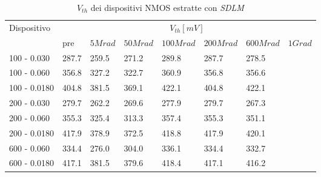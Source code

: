 \documentclass[
	a4paper,
	cleardoublepage=empty,
	headings=twolinechapter,
	numbers=autoenddot,
]{scrbook}
\begin{document}
\begin{table}[H]
  \renewcommand{\arraystretch}{1.3}
  \begin{tabular}{m{2.1cm} m{0.8cm} m{1.1cm} m{1.3cm} m{1.5cm} m{1.5cm} m{1.5cm} m{1cm}}
    \toprule
    \multirow{2}{*}{Dispositivo} & \multicolumn{7}{c}{$V_{th} [mV] $}                                                                    \\
    \cmidrule{2-8}
                                 & pre                                & $5Mrad$ & $50Mrad$ & $100Mrad$ & $200Mrad$ & $600Mrad$ & $1Grad$ \\
    \midrule
    100 - 0.030                     & 287.7                              & 259.5   & 271.2    & 289.8     & 287.7     & 278.5     &         \\
    \hline
    100 - 0.060                     & 356.8                              & 327.2   & 322.7    & 360.9     & 356.8     & 356.6     &         \\
    \hline
    100 - 0.0180                    & 404.8                              & 381.5   & 369.1    & 422.1     & 404.8     & 422.1     &         \\
    \hline
    200 - 0.030                     & 279.7                              & 262.2   & 269.6    & 277.9     & 279.7     & 267.3     &         \\
    \hline
    200 - 0.060                     & 355.3                              & 325.4   & 313.3    & 357.4     & 355.3     & 351.1     &         \\
    \hline
    200 - 0.0180                    & 417.9                              & 378.9   & 372.5    & 418.8     & 417.9     & 420.1     &         \\
    \hline
    600 - 0.060                     & 334.4                              & 276.0   & 304.0    & 336.1     & 334.4     & 332.7     &         \\
    \hline
    600 - 0.0180                    & 417.1                              & 381.5   & 379.6    & 418.4     & 417.1     & 416.2     &         \\
    \bottomrule
  \end{tabular}
  \caption{$V_{th}$ dei dispositivi NMOS estratte con \emph{SDLM}}
  \label{tab:VthSDLMN}
\end{table}
\end{document}
